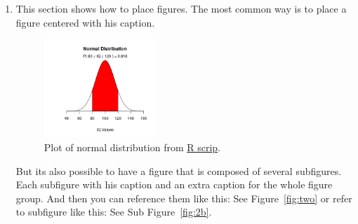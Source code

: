 \begin{enumerate}
 \item This section shows how to place figures.
 The most common way is to place a figure centered with his caption.
 
\begin{figure}[htb]
  \centering
  \label{fig:one}
  \includegraphics[width=0.4\textwidth]{img/normal}
  \caption{Plot of normal distribution from \href{https://www.statmethods.net/advgraphs/probability.html}{R scrip}.}
\end{figure}

But its also possible to have a figure that is composed of several subfigures.
Each subfigure with his caption and an extra caption for the whole figure group.
And then you can reference them like this: See Figure~\ref{fig:two} or refer to subfigure like this:
See Sub Figure~\ref{fig:2b}.


\end{enumerate}
